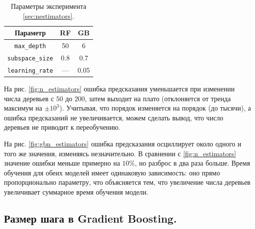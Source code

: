 \documentclass[12pt]{extarticle}
\begin{document}
\begin{table}
    \vspace{-5mm}
    \caption{Параметры эксперимента \ref{sec:nestimators}.}
    \label{tbl:nestimators}
    \begin{tabular}{c|c|c}
        Параметр & RF & GB \\
        \hline
        \texttt{max\_depth} & 50 & 6 \\
        \texttt{subspace\_size} & 0.8 & 0.7 \\
        \texttt{learning\_rate} & --- & 0.05\\
    \end{tabular}
\end{table} 

На рис. \ref{fig:n_estimators} ошибка предсказания уменьшается при изменении числа деревьев с $50$ до $200$, затем выходит на плато (отклоняется от тренда максимум на $\pm10^3$). Учитывая, что порядок изменяется на порядок (до тысячи), а ошибка предсказаний не увеличивается, можем сделать вывод, что число деревьев не приводит к переобучению.

На рис. \ref{fig:gbn_estimators} ошибка предсказания осциллирует около одного и того же значения, изменяясь незначительно. В сравнении с \ref{fig:n_estimators} значение ошибки меньше примерно на $10\%$, но разброс в два раза больше. Время обучения для обеих моделей имеет одинаковую зависимость: оно прямо пропорционально параметру, что объясняется тем, что увеличение числа деревьев увеличивает суммарное время обучения модели.

\subsection{Размер шага в Gradient Boosting.} \label{sec:lr}
\end{document}
